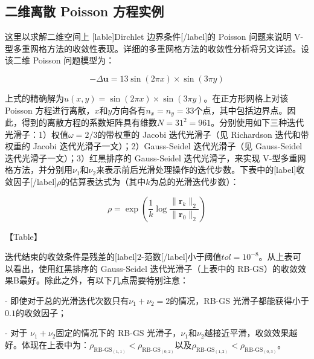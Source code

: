 \documentclass[12pt, UTF8, nofonts]{ctexart}
\begin{document}


\subsection*{二维离散 Poisson 方程实例}

这里以求解二维空间上 [lable]Dirchlet 边界条件[/label]的 Poisson 问题来说明 V-型多重网格方法的收敛性表现。详细的多重网格方法的收敛性分析将另文详述。设该二维 Poisson 问题模型为：

\[
  -\Delta \boldsymbol{u} = 13 \sin(2\pi x) \times \sin(3\pi y)
\]

上式的精确解为$u(x,y)=\sin(2\pi x)\times \sin(3\pi y)$。在正方形网格上对该 Poisson 方程进行离散，$x$和$y$方向各有$n_x=n_y=33$个点，其中包括边界点。因此，得到的离散方程的系数矩阵具有维数$N=31^2=961$。分别使用如下三种迭代光滑子：1）权值$\omega=2/3$的带权重的 Jacobi 迭代光滑子（见 Richardson 迭代和带权重的 Jacobi 迭代光滑子一文）；2）Gauss-Seidel 迭代光滑子（见 Gauss-Seidel 迭代光滑子一文）；3）红黑排序的 Gauss-Seidel 迭代光滑子，来实现 V-型多重网格方法，并分别用$\nu_1$和$\nu_2$来表示前后光滑处理操作的迭代步数。下表中的[label]收敛因子[/label]$\rho$的估算表达式为（其中$k$为总的光滑迭代步数）：

\[
  \rho = \exp\left(\dfrac{1}{k} \log \dfrac{\|\boldsymbol{r}_k\|_2} {\|\boldsymbol{r}_0\|_2}\right)
\]

【Table】

迭代结束的收敛条件是残差的[label]$2$-范数[/label]小于阈值$tol=10^{-8}$。从上表可以看出，使用红黑排序的 Gauss-Seidel 迭代光滑子（上表中的 RB-GS）的收敛效果B最好。除此之外，有以下几点需要特别注意：

- 即使对于总的光滑迭代次数只有$\nu_1+\nu_2=2$的情况，RB-GS 光滑子都能获得小于$0.1$的收敛因子；

- 对于 $\nu_1+\nu_2$固定的情况下的 RB-GS 光滑子，$\nu_1$和$\nu_2$越接近平滑，收敛效果越好。体现在上表中为：$\rho_{\textrm{RB-GS}_{(1,1)}}<\rho_{\textrm{RB-GS}_{(0,2)}}$以及$\rho_{\textrm{RB-GS}_{(1,2)}}<\rho_{\textrm{RB-GS}_{(0,3)}}$。

\end{document}
